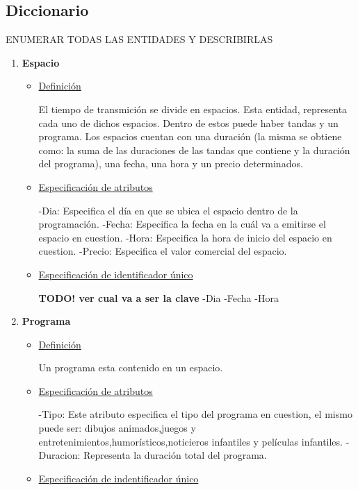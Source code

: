 \documentclass[a4paper,10pt,titlepage]{article}
\begin{document}
\subsection{Diccionario}
ENUMERAR TODAS LAS ENTIDADES Y DESCRIBIRLAS
\begin{enumerate}

\item {\bf Espacio}

\begin{itemize}
 
\item \underline{Definici\'on}

El tiempo de transmici\'on se divide en espacios. Esta entidad, representa cada uno de dichos espacios.
Dentro de estos puede haber tandas y un programa. Los espacios cuentan con una duraci\'on
(la misma se obtiene como: la suma de las duraciones de las tandas que contiene y la duraci\'on del programa), una fecha, una hora y un precio determinados.

\item \underline{Especificaci\'on de atributos}

-Dia: Especifica el d\'ia en que se ubica el espacio dentro de la programaci\'on.
-Fecha: Especifica la fecha en la cu\'al va a emitirse el espacio en cuestion.
-Hora: Especifica la hora de inicio del espacio en cuestion.
-Precio: Especifica el valor comercial del espacio.

\item \underline{Especificaci\'on de identificador \'unico}

{\bf TODO! ver cual va a ser la clave}
-Dia
-Fecha
-Hora
\end{itemize}

\item {\bf Programa}

\begin{itemize}
 
\item \underline{Definici\'on}

Un programa esta contenido en un espacio. 

\item \underline{Especificaci\'on de atributos}

-Tipo: Este atributo especifica el tipo del programa en cuestion, el mismo puede ser: dibujos animados,juegos y entretenimientos,humor\'isticos,noticieros infantiles y pel\'iculas infantiles.
-Duracion: Representa la duraci\'on total del programa.

\item \underline{Especificaci\'on de indentificador \'unico}


\end{itemize}
\end{enumerate}
\end{document}
